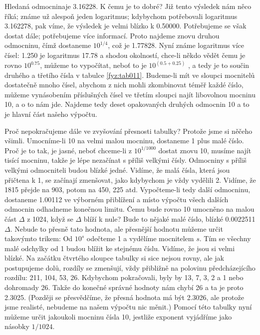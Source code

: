     Hledaná odmocninaje \num{3.16228}. K čemu je to dobré? Již tento výsledek nám něco říká; známe
    už alespoň jeden logaritmus; kdybychom potřebovali logaritmus \num{3.162278}, pak víme, že
    výsledek je velmi blízko k \num{0.500 00}. Potřebujeme se však dostat dále; potřebujeme více
    informací. Proto najdeme znovu druhou odmocninu, čímž dostaneme \(10^{1/4}\), což je
    \num{1.77828}. Nyní známe logaritmus více čísel: \num{1.250} je logaritmus \num{17.78} a shodou
    okolností, chce-li někdo vědět čemu je rovno \(10^{0.75}\), můžeme to vypočítat, neboť to je
    \(10^{(0.5+0.25)}\) , a tedy je to součin druhého a třetího čísla v tabulce \ref{fyz:tab011}.
    Budeme-li mít ve sloupci mocnitelů dostatečně mnoho čísel, abychom z nich mohli zkombinovat
    téměř každé číslo, můžeme vynásobením příslušných čísel ve třetím sloupci najít libovolnou
    mocninu 10, a o to nám jde. Najdeme tedy deset opakovaných druhých odmocnin 10 a to je hlavní
    část našeho výpočtu.

    Proč nepokračujeme dále ve zvyšování přesnosti tabulky? Protože jsme si něčeho všimli.
    Umocníme-li \num{10} na velmi malou mocninu, dostaneme 1 plus malé číslo. Proč je to tak, je
    jasné, neboť chceme-li z \(10^{1/1000}\) dostat znovu \num{10}, musíme najít tisící mocninu,
    takže je lépe nezačínat s příliš velkými čísly. Odmocniny s příliš velkými odmocniteli budou
    blízké jedné. Vidíme, že malá čísla, která jsou přičtena k 1, se začínají zmenšovat, jako
    kdybychom je vždy vydělili 2. Vidíme, že \num{1815} přejde na \num{903}, potom na \num{450},
    \num{225} atd. Vypočteme-li tedy další odmocninu, dostaneme \num{1.00112} ve výborném přiblížení
    a místo výpočtu všech dalších odmocnin odhadneme konečnou limitu. Čemu bude rovno 10 umocněno na
    malou část \(\Delta\) z \num{1024}, když se \(\Delta\) blíží k nule? Bude to nějaké malé číslo,
    blízké \num{0.0022511} \(\Delta\). Nebude to přesně tato hodnota, ale přesnější hodnotu můžeme
    určit takovýmto trikem: Od \(10^s\) odečteme 1 a vydělíme mocnitelem \(s\). Tím se všechny malé
    odchylky od 1 budou blížit ke stejnému číslu. Vidíme, že jsou si velmi blízké. Na začátku
    čtvrtého sloupce tabulky si sice nejsou rovny, ale jak postupujeme dolů, rozdíly se zmenšují,
    vždy přibližně na polovinu předcházejícího rozdílu: \num{211}, \num{104}, \num{53}, \num{26}.
    Kdybychom pokračovali, byly by \num{13}, \num{7}, \num{3}, \num{2} a \num{1} nebo dohromady
    \num{26}. Takže do konečné správné hodnoty nám chybí \num{26} a ta je proto \num{2.3025}.
    (Později se přesvědčíme, že přesná hodnota má být \num{2.3026}, ale protože jsme realisté,
    nebudeme na našem výpočtu nic měnit.) Pomocí této tabulky nyní můžeme určit jakoukoli mocninu
    čísla 10, jestliže exponent vyjádříme jako násobky \(1/1024\).

